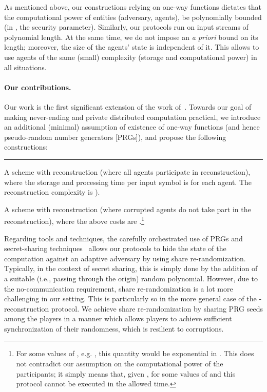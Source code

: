 \documentclass[letterpaper,11pt]{article}
\newlength{\saveparindent}
\newlength{\saveparskip}
\newenvironment{tiret}{\begin{list}{\hspace{1pt}\rule[0.5ex]{6pt}{1pt}\hfill}{\labelwidth=15pt\labelsep=3pt \leftmargin=18pt \topsep=1pt\setlength{\listparindent}{\saveparindent}\setlength{\parsep}{\saveparskip}\setlength{\itemsep}{1pt}}}{\end{list}}
\begin{document}
As mentioned above, our constructions relying on one-way functions
dictates that the computational power of entities (adversary, agents),
be polynomially bounded (in
, the security parameter).
Similarly, our protocols run on input streams of polynomial length.
At the same time, we do not impose an {\it a priori} bound on its length; 
moreover, the size of the agents' state is independent of it.
This allows  to use agents of the same (small) complexity (storage and 
computational power) in all situations.


\vspace{-.1in}

\paragraph{Our contributions.}
Our work is the first significant extension of the work
of~\cite{DGGK11}.  Towards our goal of making never-ending and private
distributed computation practical, we introduce an additional (minimal)
assumption of existence of one-way functions (and hence pseudo-random
number generators [PRGs]), and propose the following constructions:
\begin{tiret}
\item  A scheme with  reconstruction (where all  agents participate in reconstruction), where
the storage and processing time per input symbol is  for each
agent. The reconstruction complexity is ).
\item A scheme with  reconstruction (where  corrupted agents do not 
take part in the reconstruction), where the above costs are 
.\footnote{For some values of , e.g. , this quantity would be exponential in . This does not contradict our
assumption on the computational power of the participants; it simply
means that, given , for some values of  and  this
protocol cannot be executed in the allowed time.}
\end{tiret} 
Regarding tools and techniques, the carefully orchestrated use of PRGs
and secret-sharing techniques~\cite{Sha79} allows our protocols to hide the state of the computation against an adaptive adversary by using share re-randomization. 
Typically, in the context of secret sharing, this is simply done by the addition of a suitable (i.e., passing through the origin) random polynomial. However, due to the no-communication requirement, share re-randomization is a lot more challenging in our setting. This is particularly so in the more general case of the -reconstruction protocol. We achieve share re-randomization by sharing PRG seeds among the players in a manner which allows players to achieve sufficient synchronization of their randomness, which is resilient to  corruptions.
\end{document}
